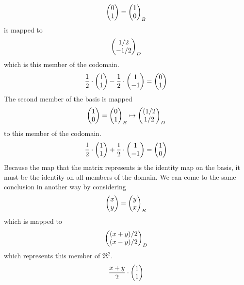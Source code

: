 \begin{exercises}
\begin{answer}
\begin{exparts}
\begin{equation*}
            \begin{pmatrix} 0 \\ 1 \end{pmatrix}=\begin{pmatrix} 1 \\ 0 \end{pmatrix}_B
          \end{equation*}
          is mapped to 
          \begin{equation*}
            \begin{pmatrix} 1/2 \\ -1/2 \end{pmatrix}_D
          \end{equation*}
          which is this member of the codomain.
          \begin{equation*}
            \frac{1}{2}\cdot\begin{pmatrix} 1 \\ 1 \end{pmatrix}
              -\frac{1}{2}\cdot\begin{pmatrix} 1 \\ -1 \end{pmatrix}
              =\begin{pmatrix} 0 \\ 1 \end{pmatrix}
          \end{equation*}
        \partsitem The second member of the basis is mapped
          \begin{equation*}
            \begin{pmatrix} 1 \\ 0 \end{pmatrix}=\begin{pmatrix} 0 \\ 1 \end{pmatrix}_B
            \mapsto
            \begin{pmatrix} (1/2 \\ 1/2 \end{pmatrix}_D 
          \end{equation*}
          to this member of the codomain.
          \begin{equation*}
            \frac{1}{2}\cdot\begin{pmatrix} 1 \\ 1 \end{pmatrix}
              +\frac{1}{2}\cdot\begin{pmatrix} 1 \\ -1 \end{pmatrix}
              =\begin{pmatrix} 1 \\ 0 \end{pmatrix}
          \end{equation*}
        \partsitem Because the map that the matrix represents is the identity
          map on the basis, it must be the identity on all members of the 
          domain.
          We can come to the same conclusion in another way by considering
          \begin{equation*}
            \begin{pmatrix} x \\ y \end{pmatrix}=\begin{pmatrix} y \\ x \end{pmatrix}_B
          \end{equation*}
          which is mapped to
          \begin{equation*}
            \begin{pmatrix} (x+y)/2 \\ (x-y)/2 \end{pmatrix}_D
          \end{equation*}
          which represents this member of $\Re^2$. 
          \begin{equation*}
            \frac{x+y}{2}\cdot\colvec{1 \\ 1}

\end{equation*}
\end{exparts}
\end{answer}
\end{exercises}
